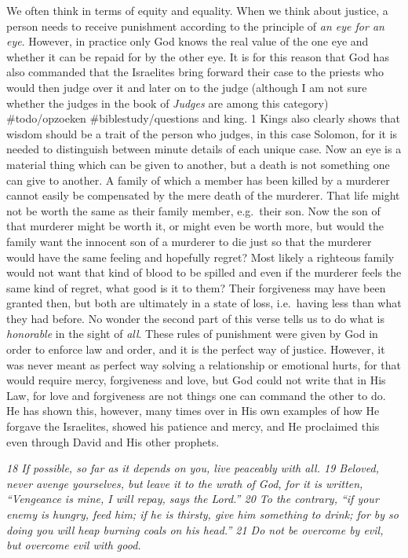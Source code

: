We often think in terms of equity and equality. When we think about
justice, a person needs to receive punishment according to the principle
of \emph{an eye for an eye}. However, in practice only God knows the
real value of the one eye and whether it can be repaid for by the other
eye. It is for this reason that God has also commanded that the
Israelites bring forward their case to the priests who would then judge
over it and later on to the judge (although I am not sure whether the
judges in the book of \emph{Judges} are among this category)
\#todo/opzoeken \#biblestudy/questions and king. 1 Kings also clearly
shows that wisdom should be a trait of the person who judges, in this
case Solomon, for it is needed to distinguish between minute details of
each unique case. Now an eye is a material thing which can be given to
another, but a death is not something one can give to another. A family
of which a member has been killed by a murderer cannot easily be
compensated by the mere death of the murderer. That life might not be
worth the same as their family member, e.g.~their son. Now the son of
that murderer might be worth it, or might even be worth more, but would
the family want the innocent son of a murderer to die just so that the
murderer would have the same feeling and hopefully regret? Most likely a
righteous family would not want that kind of blood to be spilled and
even if the murderer feels the same kind of regret, what good is it to
them? Their forgiveness may have been granted then, but both are
ultimately in a state of loss, i.e.~having less than what they had
before. No wonder the second part of this verse tells us to do what is
\emph{honorable} in the sight of \emph{all}. These rules of punishment
were given by God in order to enforce law and order, and it is the
perfect way of justice. However, it was never meant as perfect way
solving a relationship or emotional hurts, for that would require mercy,
forgiveness and love, but God could not write that in His Law, for love
and forgiveness are not things one can command the other to do. He has
shown this, however, many times over in His own examples of how He
forgave the Israelites, showed his patience and mercy, and He proclaimed
this even through David and His other prophets.

\emph{18 If possible, so far as it depends on you, live peaceably with
all. 19 Beloved, never avenge yourselves, but leave it to the wrath of
God, for it is written, ``Vengeance is mine, I will repay, says the
Lord.'' 20 To the contrary, ``if your enemy is hungry, feed him; if he
is thirsty, give him something to drink; for by so doing you will heap
burning coals on his head.'' 21 Do not be overcome by evil, but overcome
evil with good.}


